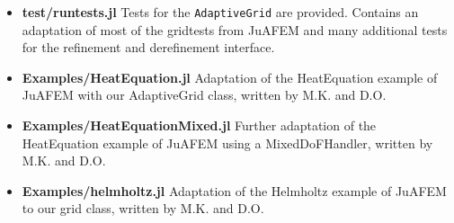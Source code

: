 \documentclass{article}
\begin{document}
\begin{itemize}
    \item {\bf test/runtests.jl} Tests for the \texttt{AdaptiveGrid} are provided. Contains an adaptation of most of the gridtests from JuAFEM and many additional tests for the refinement and derefinement interface.
    \item {\bf Examples/HeatEquation.jl} Adaptation of the HeatEquation example of JuAFEM with our AdaptiveGrid class, written by M.K. and D.O.
    \item {\bf Examples/HeatEquationMixed.jl} Further adaptation of the HeatEquation example of JuAFEM using a MixedDoFHandler, written by M.K. and D.O.
    \item {\bf Examples/helmholtz.jl} Adaptation of the Helmholtz example of JuAFEM to our grid class, written by M.K. and D.O.
\end{itemize}
\end{document}
